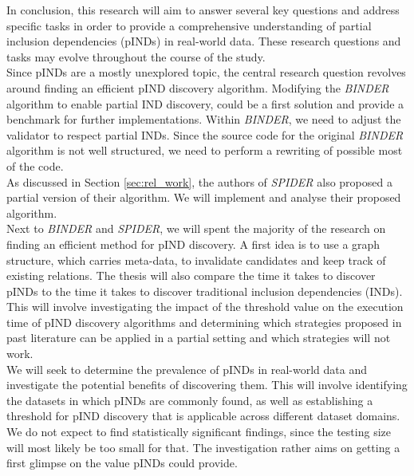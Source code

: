 In conclusion, this research will aim to answer several key questions and address specific tasks in order to provide a comprehensive understanding of partial inclusion dependencies (pINDs) in real-world data. These research questions and tasks may evolve throughout the course of the study. \\

\noindent Since pINDs are a mostly unexplored topic, the central research question revolves around finding an efficient pIND discovery algorithm. Modifying the \textit{BINDER} algorithm to enable partial IND discovery, could be a first solution and provide a benchmark for further implementations. Within \textit{BINDER}, we need to adjust the validator to respect partial INDs. Since the source code for the original \textit{BINDER} algorithm is not well structured, we need to perform a rewriting of possible most of the code. \\

\noindent As discussed in Section \ref{sec:rel_work}, the authors of \textit{SPIDER} also proposed a partial version of their algorithm. We will implement and analyse their proposed algorithm. \\

\noindent Next to \textit{BINDER} and \textit{SPIDER}, we will spent the majority of the research on finding an efficient method for pIND discovery. A first idea is to use a graph structure, which carries meta-data, to invalidate candidates and keep track of existing relations. The thesis will also compare the time it takes to discover pINDs to the time it takes to discover traditional inclusion dependencies (INDs). This will involve investigating the impact of the threshold value on the execution time of pIND discovery algorithms and determining which strategies proposed in past literature can be applied in a partial setting and which strategies will not work. \\

\noindent We will seek to determine the prevalence of pINDs in real-world data and investigate the potential benefits of discovering them. This will involve identifying the datasets in which pINDs are commonly found, as well as establishing a threshold for pIND discovery that is applicable across different dataset domains. We do not expect to find statistically significant findings, since the testing size will most likely be too small for that. The investigation rather aims on getting a first glimpse on the value pINDs could provide.

